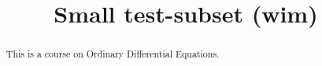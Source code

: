 \documentclass[12pt]{xourse}
\begin{document}

\title{Small test-subset (wim)}{}

\begin{abstract}
This is a course on Ordinary Differential Equations. 
\end{abstract} 

\maketitle

\chapterstyle






\end{document}
